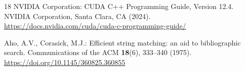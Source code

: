 \documentclass[runningheads]{llncs}
\begin{document}
\begin{thebibliography}{18}
NVIDIA Corporation: CUDA C++ Programming Guide, Version 12.4. NVIDIA
Corporation, Santa Clara, CA (2024).
\url{https://docs.nvidia.com/cuda/cuda-c-programming-guide/}

Aho, A.V., Corasick, M.J.: Efficient string matching: an aid to
bibliographic search. Communications of the ACM \textbf{18}(6),
333--340 (1975).
\url{https://doi.org/10.1145/360825.360855}

\end{thebibliography}
\end{document}
